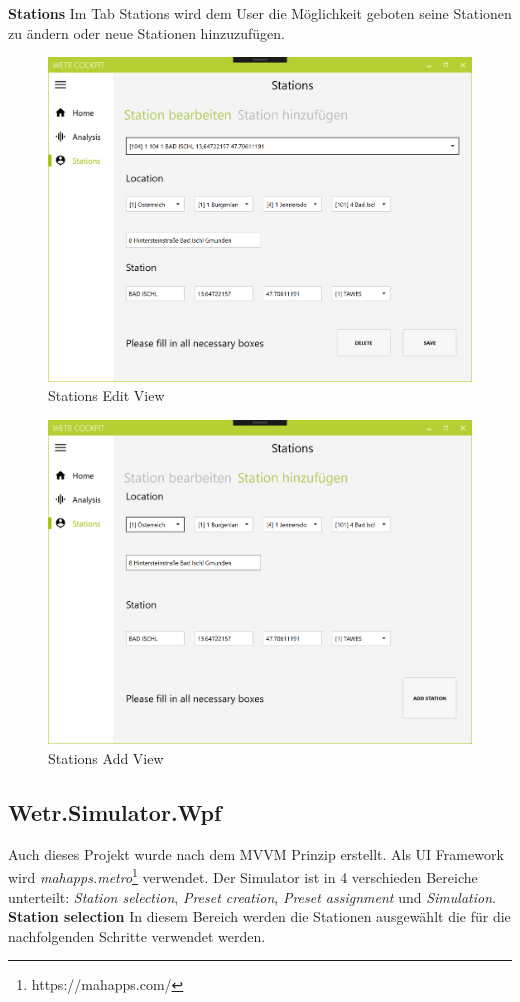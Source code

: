 \textbf{Stations}\newline
Im Tab Stations wird dem User die Möglichkeit geboten seine Stationen zu ändern oder neue Stationen hinzuzufügen.

\begin{figure}[H]
\centering
\includegraphics[width=.7\textwidth]{pictures/Cockpit/Cockpit_4.png}
\caption{Stations Edit View}
\label{fig:Wetr.Cockpit.Wpf.Station.Edit}
\end{figure}
\raggedright

\begin{figure}[H]
\centering
\includegraphics[width=.7\textwidth]{pictures/Cockpit/Cockpit_5.png}
\caption{Stations Add View}
\label{fig:Wetr.Cockpit.Wpf.Station.Add}
\end{figure}
\raggedright

\newpage
\subsection{Wetr.Simulator.Wpf}
Auch dieses Projekt wurde nach dem MVVM Prinzip erstellt. Als UI Framework wird \textit{mahapps.metro}\footnote{https://mahapps.com/} verwendet.
Der Simulator ist in 4 verschieden Bereiche unterteilt: \textit{Station selection}, \textit{Preset creation}, \textit{Preset assignment} und \textit{Simulation}. 
\newline
\newline
\textbf{Station selection}\newline
In diesem Bereich werden die Stationen ausgewählt die für die nachfolgenden Schritte verwendet werden.

